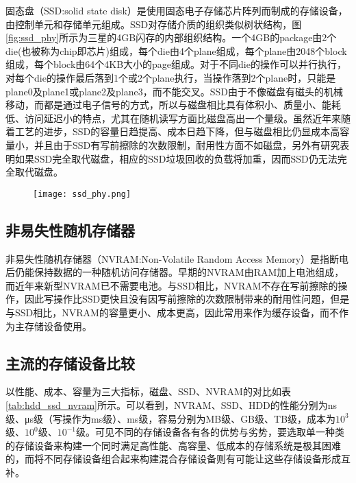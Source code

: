 固态盘（SSD:solid state disk）是使用固态电子存储芯片阵列而制成的存储设备，由控制单元和存储单元组成。SSD对存储介质的组织类似树状结构，图\ref{fig:ssd_phy}所示为三星的4GB闪存的内部组织结构\cite{agrawal2008design}。一个4GB的package由2个die(也被称为chip即芯片)组成，每个die由4个plane组成，每个plane由2048个block组成，每个block由64个4KB大小的page组成。对于不同die的操作可以并行执行，对每个die的操作最后落到1个或2个plane执行，当操作落到2个plane时，只能是plane0及plane1或plane2及plane3，而不能交叉。SSD由于不像磁盘有磁头的机械移动，而都是通过电子信号的方式，所以与磁盘相比具有体积小、质量小、能耗低、访问延迟小的特点\cite{agrawal2008design, dirik2009performance}，尤其在随机读写方面比磁盘高出一个量级。虽然近年来随着工艺的进步，SSD的容量日趋提高、成本日趋下降，但与磁盘相比仍显成本高容量小，并且由于SSD有写前擦除的次数限制，耐用性方面不如磁盘，另外有研究\cite{kgil2008improving}表明如果SSD完全取代磁盘，相应的SSD垃圾回收的负载将加重，因而SSD仍无法完全取代磁盘。

\begin{figure}[!htp]
  \centering
  \texttt{[image: ssd\_phy.png]}
  \hspace{1cm}
\end{figure}

\subsection{非易失性随机存储器}

非易失性随机存储器（NVRAM:Non-Volatile Random Access Memory）是指断电后仍能保持数据的一种随机访问存储器。早期的NVRAM由RAM加上电池组成，而近年来新型NVRAM已不需要电池。与SSD相比，NVRAM不存在写前擦除的操作，因此写操作比SSD更快且没有因写前擦除的次数限制带来的耐用性问题，但是与SSD相比，NVRAM的容量更小、成本更高，因此常用来作为缓存设备，而不作为主存储设备使用。

\subsection{主流的存储设备比较}

以性能、成本、容量为三大指标，磁盘、SSD、NVRAM的对比如表\ref{tab:hdd_ssd_nvram}所示。可以看到，NVRAM、SSD、HDD的性能分别为ns级、μs级（写操作为ms级）、ms级，容易分别为MB级、GB级、TB级，成本为$10^{3}$级、$10^{0}$级、$10^{-1}$级。可见不同的存储设备各有各的优势与劣势，要选取单一种类的存储设备来构建一个同时满足高性能、高容量、低成本的存储系统是极其困难的，而将不同存储设备组合起来构建混合存储设备则有可能让这些存储设备形成互补。

